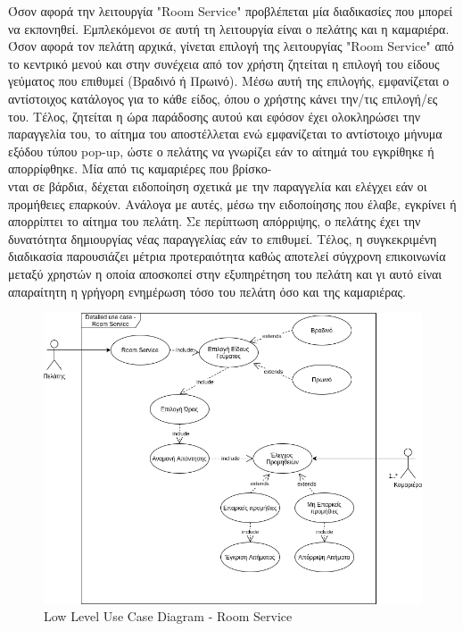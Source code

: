 \noindent 
Όσον αφορά την λειτουργία "Room Service" προβλέπεται μία διαδικασίες που μπορεί να εκπονηθεί.
Εμπλεκόμενοι σε αυτή τη λειτουργία είναι ο πελάτης και η καμαριέρα. Όσον αφορά τον πελάτη αρχικά,
γίνεται επιλογή της λειτουργίας "Room Service" από το κεντρικό μενού και στην συνέχεια από τον χρήστη
ζητείται η επιλογή του είδους γεύματος που επιθυμεί (Βραδινό ή Πρωινό). Μέσω αυτή της επιλογής, 
εμφανίζεται ο αντίστοιχος κατάλογος για το κάθε είδος, όπου ο χρήστης κάνει την/τις  επιλογή/ες του. 
Τέλος,  ζητείται η ώρα παράδοσης αυτού και εφόσον έχει ολοκληρώσει την παραγγελία του, το αίτημα 
του αποστέλλεται ενώ εμφανίζεται το αντίστοιχο μήνυμα εξόδου τύπου pop-up, ώστε ο πελάτης να 
γνωρίζει εάν το αίτημά του εγκρίθηκε ή απορρίφθηκε.  Μία από τις καμαριέρες που βρίσκο-\\νται σε 
βάρδια, δέχεται ειδοποίηση σχετικά με την παραγγελία και ελέγχει εάν οι προμήθειες επαρκούν. 
Ανάλογα με αυτές, μέσω την ειδοποίησης που έλαβε, εγκρίνει ή απορρίπτει το αίτημα του πελάτη. Σε  
περίπτωση απόρριψης, ο πελάτης έχει την δυνατότητα δημιουργίας νέας παραγγελίας εάν το επιθυμεί.
Τέλος, η συγκεκριμένη διαδικασία παρουσιάζει μέτρια προτεραιότητα καθώς αποτελεί σύγχρονη 
επικοινωνία μεταξύ χρηστών η οποία αποσκοπεί στην εξυπηρέτηση του πελάτη και γι αυτό 
είναι απαραίτητη η γρήγορη ενημέρωση τόσο του πελάτη όσο και της καμαριέρας. \\
\begin{figure}[H]
	\centering
	\includegraphics[width=1\textwidth]{Images/Low_level_use_case-Room service}
	\caption{Low Level Use Case Diagram - Room Service}
	\label{Low_level_use_case - Room Service}
\end{figure}

